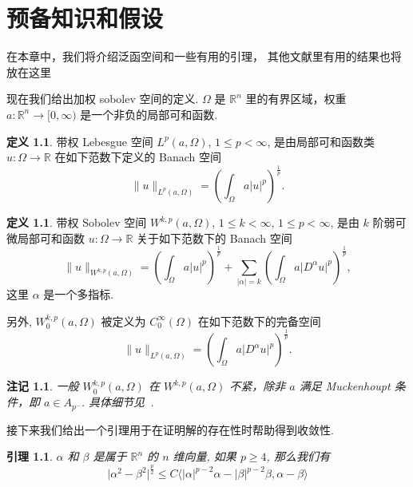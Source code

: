 \documentclass[twoside,longtitle]{LZUthesis}
\newtheorem{lemma}[theorem]{引理}
\newtheorem{remark}[theorem]{注记}
\theoremstyle{definition}
\newtheorem{definition}[theorem]{定义}
\numberwithin{equation}{chapter}
\newcommand*\abs[1]{\lvert#1\rvert}
\newcommand*\norm[1]{\lVert#1\rVert}
\newcommand\R{\mathbb{R}}
\begin{document}
\chapter{预备知识和假设}\label{ch:preliminaries}
在本章中，我们将介绍泛函空间和一些有用的引理，
其他文献里有用的结果也将放在这里

现在我们给出加权 sobolev 空间的定义.
$\Omega$ 是 $\R^n$ 里的有界区域，权重
$a \colon \R^n \to [0, \infty)$
是一个非负的局部可和函数.
\begin{definition}
	带权 Lebesgue 空间 $L^p(a, \Omega)$, $1 \leq p < \infty$,
	是由局部可和函数类
	$u \colon \Omega \to \R$ 在如下范数下定义的 Banach 空间
	\begin{equation}
		\norm{u}_{L^p(a,\Omega)} =
		\left( \int_{\Omega}a\abs{u}^p \right)^{\frac{1}{p}}.
	\end{equation}
\end{definition}
\begin{definition}
	带权 Sobolev 空间 $W^{k,p}(a,\Omega)$,
	$1 \leq k < \infty$, $1 \leq p < \infty$,
	是由 $k$ 阶弱可微局部可和函数
	$u \colon \Omega \to \R$ 关于如下范数下的 Banach 空间
	\begin{equation}
		\norm{u}_{W^{k,p}(a,\Omega)} =
		\left( \int_{\Omega}a\abs{u}^p \right)^{\frac{1}{p}}
		+ \sum_{\abs{\alpha}=k}
		\left( \int_{\Omega}a\abs{D^{\alpha}u}^p \right)^{\frac{1}{p}},
	\end{equation}
	这里 $\alpha$ 是一个多指标.
	
	另外,
	$W_0^{k,p}(a,\Omega)$ 被定义为
	$C_0^{\infty}(\Omega)$ 在如下范数下的完备空间
	\begin{equation}
		\norm{u}_{L^p(a,\Omega)} =
		\left( \int_{\Omega}a\abs{D^{\alpha}u}^p \right)^{\frac{1}{p}}.
	\end{equation}
\end{definition}
\begin{remark}
	一般 $W_0^{k,p}(a,\Omega)$ 在
	$W^{k,p}(a,\Omega)$ 不紧，除非 $a$ 满足 Muckenhoupt 条件，即 $a \in A_{p^-}$. 具体细节见~\cite{goldshteinWeightedSobolevSpaces2009}.
\end{remark}
接下来我们给出一个引理用于在证明解的存在性时帮助得到收敛性.
\begin{lemma}\label{lem:VecIneq}
	$\alpha$ 和 $\beta$ 是属于 $\R^{n}$ 的 $n$ 维向量, 如果 $p \geq 4$, 那么我们有
	\begin{equation}
		\abs{\alpha^2 - \beta^2}^{\frac{p}{2}}
		\leq C \langle \abs{\alpha}^{p-2}\alpha - \abs{\beta}^{p-2}\beta, \alpha-\beta\rangle
	\end{equation}
\end{lemma}
\end{document}
